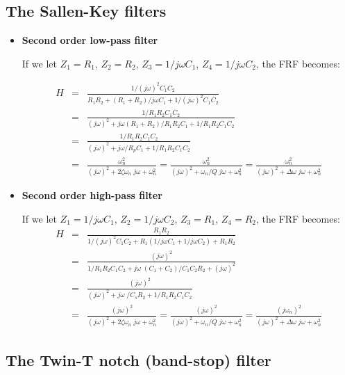 \usepackage{html}


\subsection{The Sallen-Key filters}

\begin{itemize}
\item {\bf Second order low-pass filter}
  
  If we let $Z_1=R_1$, $Z_2=R_2$, $Z_3=1/j\omega C_1$, $Z_4=1/j\omega C_2$, 
  the FRF becomes:

  \begin{eqnarray}
    H&=&\frac{1/(j\omega)^2C_1C_2}
    {R_1R_2+(R_1+R_2)/j\omega C_1+1/(j\omega)^2C_1C_2}
    \nonumber \\
    &=&\frac{1/R_1R_2C_1C_2}{(j\omega)^2+j\omega(R_1+R_2)/R_1R_2C_1+1/R_1R_2C_1C_2}
    \nonumber \\
    &=&\frac{1/R_1R_2C_1C_2}{(j\omega)^2+j\omega/R_pC_1+1/R_1R_2C_1C_2}
    \nonumber \\
    &=&\frac{\omega_n^2}{(j\omega)^2+2\zeta\omega_n\;j\omega+\omega_n^2} 
    =\frac{\omega_n^2}{(j\omega)^2+\omega_n/Q \;j\omega+\omega_n^2}
    =\frac{\omega_n^2}{(j\omega)^2+\Delta\omega\;j\omega+\omega_n^2} 
    \nonumber
  \end{eqnarray}

\item {\bf Second order high-pass filter}
    
  If we let $Z_1=1/j\omega C_1$, $Z_2=1/j\omega C_2$, $Z_3=R_1$, $Z_4=R_2$, 
  the FRF becomes:
  \begin{eqnarray}
    H&=&\frac{R_1R_2}
    {1/(j\omega)^2C_1C_2+R_1(1/j\omega C_1+1/j\omega C_2)+R_1R_2}
    \nonumber \\
    &=&\frac{(j\omega)^2}{1/R_1R_2C_1C_2+j\omega\;(C_1+C_2)/C_1C_2R_2+(j\omega)^2}
    \nonumber \\
    &=&\frac{(j\omega)^2}{(j\omega)^2+j\omega\;/C_sR_2+1/R_1R_2C_1C_2}
    \nonumber \\
    &=&\frac{(j\omega)^2}{(j\omega)^2+2\zeta\omega_n\;j\omega+\omega_n^2} 
    =\frac{(j\omega)^2}{(j\omega)^2+\omega_n/Q \;j\omega+\omega_n^2} 
    =\frac{(j\omega_n)^2}{(j\omega)^2+\Delta\omega\;j\omega+\omega_n^2}
    \nonumber
  \end{eqnarray}
\end{itemize}



\subsection{The Twin-T notch (band-stop) filter}

